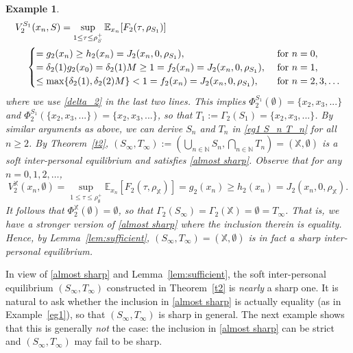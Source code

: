 \documentclass[11pt,reqno]{article}
\numberwithin{equation}{section}
\newtheorem{example}{Example}[section]
\newcommand{\E}{\mathbb{E}}
\newcommand{\N}{\mathbb{N}}
\newcommand{\X}{\mathbb{X}}
\begin{document}
\begin{example}
\begin{align}
V^{S_1}_2(x_n,S)& = \sup_{1\le \tau\le \rho^+_S} \E_{x_n}[F_2(\tau,\rho_{S_1})]\notag\\
&\hspace{-0.5in}\begin{cases}
=g_2(x_n)\ge h_2(x_n) = J_2(x_n,0,\rho_{S_1}),\ &\hbox{for}\ n=0,\\
= \delta_2(1) g_2(x_0) = \delta_2(1) M \ge1=f_2(x_n) = J_2(x_n,0,\rho_{S_1}),\ &\hbox{for}\ n=1,\\
\le \max\{\delta_2(1), \delta_2(2) M\}<1 = f_2(x_n) = J_2(x_n,0,\rho_{S_1}),\ &\hbox{for}\ n=2,3, \dotso\label{3in} 
\end{cases}
\end{align}
where we use \eqref{delta_2} in the last two lines.
This implies $\Phi^{S_1}_2(\emptyset) = \{x_2, x_3, ...\}$ and $\Phi^{S_1}_2(\{x_2, x_3,...\}) = \{x_2,x_3,...\}$, so that $T_1 := \Gamma_2(S_1)=\{x_2,x_3,...\}$. By similar arguments as above, we can derive $S_n$ and $T_n$ in \eqref{eg1 S_n T_n} for all $n\ge 2$. %
By Theorem~\ref{t2}, $(S_\infty,T_\infty):= (\bigcup_{n\in\N} S_n, \bigcap_{n\in\N} T_n) = (\X,\emptyset)$ is a soft inter-personal equilibrium and satisfies \eqref{almost sharp}.
Observe that for any $n=0,1,2,\dotso$, %
\[
V^{\X}_2(x_n,\emptyset) = \sup_{1\le \tau\le \rho^+_\emptyset} \E_{x_n}[F_2(\tau,\rho_{\X})]=g_2(x_n)\ge h_2(x_n) = J_2(x_n,0,\rho_\X).
\]
It follows that $\Phi^\X_2(\emptyset)=\emptyset$, so that $\Gamma_2(S_\infty) =\Gamma_2(\X)=\emptyset=T_\infty$. That is, we have a stronger version of \eqref{almost sharp} where the inclusion therein is equality. Hence, by Lemma~\ref{lem:sufficient}, $(S_\infty,T_\infty)=(\X,\emptyset)$ is in fact a sharp inter-personal equilibrium.  
\end{example}

In view of \eqref{almost sharp} and Lemma~\ref{lem:sufficient}, the soft inter-personal equilibrium $(S_\infty,T_\infty)$ constructed in Theorem~\ref{t2} is {\it nearly} a sharp one. It is natural to ask whether the inclusion in \eqref{almost sharp} is actually equality (as in Example~\ref{eg1}), so that $(S_\infty,T_\infty)$ is sharp in general. The next example shows that this is generally {\it not} the case: the inclusion in \eqref{almost sharp} can be strict and $(S_\infty,T_\infty)$ may fail to be sharp.
\end{document}
